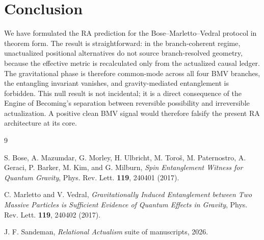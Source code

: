 \documentclass[11pt]{article}
\begin{document}
\section{Conclusion}

We have formulated the RA prediction for the Bose--Marletto--Vedral protocol in theorem form. The result is straightforward: in the branch-coherent regime, unactualized positional alternatives do not source branch-resolved geometry, because the effective metric is recalculated only from the actualized causal ledger. The gravitational phase is therefore common-mode across all four BMV branches, the entangling invariant vanishes, and gravity-mediated entanglement is forbidden. This null result is not incidental; it is a direct consequence of the Engine of Becoming's separation between reversible possibility and irreversible actualization. A positive clean BMV signal would therefore falsify the present RA architecture at its core.

\begin{thebibliography}{9}

S. Bose, A. Mazumdar, G. Morley, H. Ulbricht, M. Toro\v{s}, M. Paternostro, A. Geraci, P. Barker, M. Kim, and G. Milburn,
\emph{Spin Entanglement Witness for Quantum Gravity},
Phys. Rev. Lett. \textbf{119}, 240401 (2017).

C. Marletto and V. Vedral,
\emph{Gravitationally Induced Entanglement between Two Massive Particles is Sufficient Evidence of Quantum Effects in Gravity},
Phys. Rev. Lett. \textbf{119}, 240402 (2017).

J. F. Sandeman,
\emph{Relational Actualism} suite of manuscripts, 2026.

\end{thebibliography}
\end{document}
